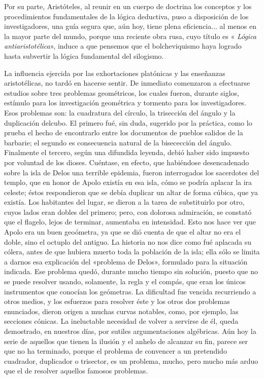 \documentclass[a4paper, 12pt, draft]{article}
\begin{document}
{Por su parte, Aristóteles, al reunir en un cuerpo de doctrina los conceptos y los procedimientos fundamentales de la lógica deductiva, puso a disposición de los investigadores, una guía segura que, aún hoy, tiene plena eficiencia... al menos en la mayor parte del mundo, porque una reciente obra rusa, cuyo título es «\textit{ Lógica antiaristotélica}», induce a que pensemos que el bolcheviquismo haya logrado hasta subvertir la lógica fundamental del silogismo.

La influencia ejercida por las exhortaciones platónicas y las enseñanzas aristotélicas, no tardó en hacerse sentir. De inmediato comenzaron a efectuarse
estudios sobre tres problemas geométricos, los cuales fueron, durante siglos, estímulo para los investigación  geométrica y tormento para los investigadores. Esos problemas son: la cuadratura del círculo, la trisección del ángulo
y la duplicación delcubo. El  primero fué, sin duda, sugerido por la práctica, como lo prueba el hecho de encontrarlo entre los  documentos de pueblos salidos de la barbarie; el 
segundo es consecuencia natural de la bisecección del ángulo. Finalmente el tercero, según una difundida leyenda, debió haber sido impuesto por	voluntad
de los dioses. Cuéntase, en efecto, que habiéndose desencadenado sobre la isla de Delos una terrible epidemia, fueron interrogados los sacerdotes del templo, que en honor de Apolo existía en esa isla, cómo se podría aplacar la ira celeste; éstos respondieron que se debía duplicar un altar de forma cúbica, que ya existía. Los habitantes del lugar, se dieron a la tarea de substituirlo por otro, cuyos lados eran dobles del primero; pero, con dolorosa admiración, se constató que el flagelo, lejos de terminar, aumentaba en intensidad. Esto nos hace ver que Apolo era un buen geoómetra, ya que se dió cuenta de que el altar no era el doble, sino	el octuplo del antiguo. La historia no nos dice como fué  
aplacada su cólera, antes de que hubiera muerto toda la población de la isla; ella sólo se limita a darnos esa explicación del «problema de Delos», formulado para la situación indicada. Ese problema quedó, durante mucho tiempo sin solución, puesto que no se puede resolver usando, solamente, la regla y el compás, que eran los únicos instrumentos que conocían los geómetras. La dificultad  fue vencida recurriendo a otros medios, y los esfuerzos para resolver éste y los otros dos problemas enunciados, dieron origen a muchas curvas notables, como, por ejemplo, las secciones	cónicas. La ineluctable necesidad de  volver a servirse de él, queda demostrado, en nuestros días, por sutiles argumentaciones algébricas. Aún hoy	 la serie de aquellos que tienen la
ilusión y	el  anhelo de alcanzar su fin, parece ser
que no ha terminado, porque el problema de convencer a un pretendido cuadrador, duplicador o trisector, es un problema, mucho, pero mucho más arduo que el de resolver aquellos famosos problemas.


}
\end{document}
